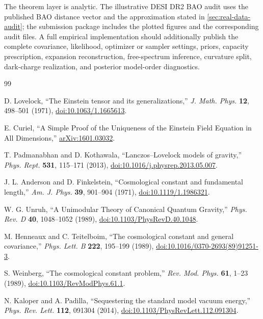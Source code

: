 \documentclass[aps,prd,reprint,nofootinbib,superscriptaddress]{revtex4-2}
\numberwithin{equation}{section}
\theoremstyle{definition}
\theoremstyle{plain}
\begin{document}
The theorem layer is analytic.  The illustrative DESI DR2 BAO audit uses the published BAO distance vector and the approximation stated in \cref{sec:real-data-audit}; the submission package includes the plotted figures and the corresponding audit files.  A full empirical implementation should additionally publish the complete covariance, likelihood, optimizer or sampler settings, priors, capacity prescription, expansion reconstruction, free-spectrum inference, curvature split, dark-charge realization, and posterior model-order diagnostics.

\begin{thebibliography}{99}

D. Lovelock,
``The Einstein tensor and its generalizations,''
\emph{J. Math. Phys.} \textbf{12}, 498--501 (1971),
\href{https://doi.org/10.1063/1.1665613}{doi:10.1063/1.1665613}.

E. Curiel,
``A Simple Proof of the Uniqueness of the Einstein Field Equation in All Dimensions,''
\href{https://arxiv.org/abs/1601.03032}{arXiv:1601.03032}.

T. Padmanabhan and D. Kothawala,
``Lanczos--Lovelock models of gravity,''
\emph{Phys. Rept.} \textbf{531}, 115--171 (2013),
\href{https://doi.org/10.1016/j.physrep.2013.05.007}{doi:10.1016/j.physrep.2013.05.007}.

J. L. Anderson and D. Finkelstein,
``Cosmological constant and fundamental length,''
\emph{Am. J. Phys.} \textbf{39}, 901--904 (1971),
\href{https://doi.org/10.1119/1.1986321}{doi:10.1119/1.1986321}.

W. G. Unruh,
``A Unimodular Theory of Canonical Quantum Gravity,''
\emph{Phys. Rev. D} \textbf{40}, 1048--1052 (1989),
\href{https://doi.org/10.1103/PhysRevD.40.1048}{doi:10.1103/PhysRevD.40.1048}.

M. Henneaux and C. Teitelboim,
``The cosmological constant and general covariance,''
\emph{Phys. Lett. B} \textbf{222}, 195--199 (1989),
\href{https://doi.org/10.1016/0370-2693(89)91251-3}{doi:10.1016/0370-2693(89)91251-3}.

S. Weinberg,
``The cosmological constant problem,''
\emph{Rev. Mod. Phys.} \textbf{61}, 1--23 (1989),
\href{https://doi.org/10.1103/RevModPhys.61.1}{doi:10.1103/RevModPhys.61.1}.


N. Kaloper and A. Padilla,
``Sequestering the standard model vacuum energy,''
\emph{Phys. Rev. Lett.} \textbf{112}, 091304 (2014),
\href{https://doi.org/10.1103/PhysRevLett.112.091304}{doi:10.1103/PhysRevLett.112.091304}.


\end{thebibliography}
\end{document}
